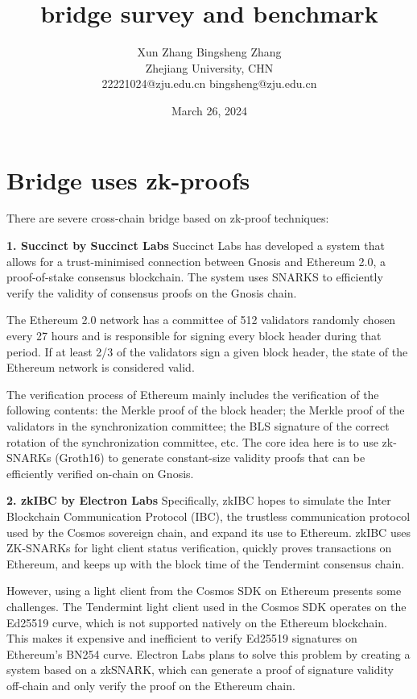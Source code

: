 \documentclass{article}
\title{bridge survey and benchmark}
\author{Xun Zhang \quad \quad Bingsheng Zhang \\ 
Zhejiang University, CHN \\
22221024@zju.edu.cn \quad bingsheng@zju.edu.cn}
\date{March 26, 2024}
\begin{document}
\maketitle

\section{Bridge uses zk-proofs}

There are severe cross-chain bridge based on zk-proof techniques:


\textbf{1. Succinct by Succinct Labs} 
Succinct Labs has developed a system that allows for a trust-minimised connection between Gnosis and Ethereum 2.0, a proof-of-stake consensus blockchain. The system uses SNARKS to efficiently verify the validity of consensus proofs on the Gnosis chain.

The Ethereum 2.0 network has a committee of 512 validators randomly chosen every 27 hours and is responsible for signing every block header during that period. If at least 2/3 of the validators sign a given block header, the state of the Ethereum network is considered valid. 

The verification process of Ethereum mainly includes the verification of the following contents: the Merkle proof of the block header; the Merkle proof of the validators in the synchronization committee; the BLS signature of the correct rotation of the synchronization committee, etc. The core idea here is to use zk-SNARKs (Groth16) to generate constant-size validity proofs that can be efficiently verified on-chain on Gnosis.


\textbf{2. zkIBC by Electron Labs}
Specifically, zkIBC hopes to simulate the Inter Blockchain Communication Protocol (IBC), the trustless communication protocol used by the Cosmos sovereign chain, and expand its use to Ethereum. zkIBC uses ZK-SNARKs for light client status verification, quickly proves transactions on Ethereum, and keeps up with the block time of the Tendermint consensus chain.

However, using a light client from the Cosmos SDK on Ethereum presents some challenges. The Tendermint light client used in the Cosmos SDK operates on the Ed25519 curve, which is not supported natively on the Ethereum blockchain. This makes it expensive and inefficient to verify Ed25519 signatures on Ethereum’s BN254 curve. Electron Labs plans to solve this problem by creating a system based on a zkSNARK, which can generate a proof of signature validity off-chain and only verify the proof on the Ethereum chain.
\end{document}
